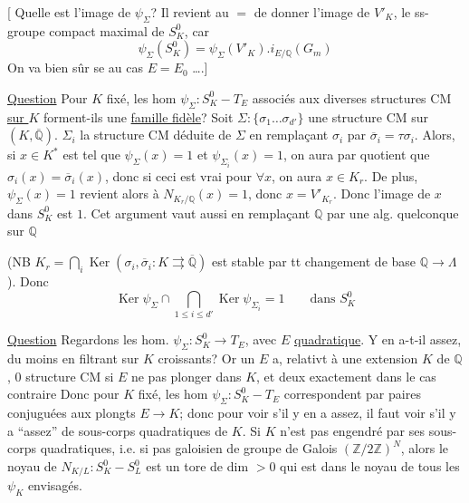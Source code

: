 [ Quelle est l'image de $\psi_\Sigma$? Il revient au $=$ de
donner l'image de $V'_K$, le ss-groupe compact maximal de $S_K^0$, car
\[
\psi_\Sigma(S_K^0)=\psi_\Sigma(V'_K).i_{E/\mathbb Q}(G_m)
\]
On va bien sûr se   au cas
$E=E_0$ \ldots.]

\uline{Question} Pour $K$ fixé,  les hom $\psi_\Sigma:S_K^0-T_E$ associés aux diverses
structures CM \uline{sur $K$}  forment-ils une \uline{famille fidèle}?
Soit $\Sigma:\{\sigma_1\ldots\sigma_{d'}\}$ une structure CM sur $(K,\overline{\mathbb Q})$.
 
$\Sigma_i$  la structure CM déduite de $\Sigma$ en remplaçant
$\sigma_i$ par $\overline\sigma_i=\tau\sigma_i$. Alors, si $x\in K^*$ est tel que
$\psi_\Sigma(x)=1$ et $\psi_{\Sigma_i}(x)=1$, on aura par quotient que
$\sigma_i(x)=\overline\sigma_i(x)$, donc si ceci est vrai pour $\forall x$,
on aura $x\in K_r$. De plus,  $\psi_\Sigma(x)=1$ revient alors à
$N_{K_r/\mathbb Q}(x)=1$, donc $x=V'_{K_r}$.
Donc l'image de $x$ dans $S_K^0$ est $1$.
Cet argument vaut aussi en remplaçant $\mathbb Q$ par une alg. quelconque sur $\mathbb Q$
\deleted{[car $\bigcap\operatorname{Ker}(\sigma_i,\overline\sigma_i)=K_r$ est
stable par}

(NB $K_r=\bigcap_i\operatorname{Ker}(\sigma_i,\overline\sigma_i:
K\rightrightarrows\overline{\mathbb Q})$ est stable par tt changement de base
$\mathbb Q\longrightarrow\Lambda$). Donc
\[
\operatorname{Ker}\psi_\Sigma\cap\bigcap_{1\leq i\leq d'}\operatorname{Ker}\psi_{\Sigma_i}
=1\qquad\text{dans }S_K^0
\]

\uline{Question} Regardons les hom. $\psi_\Sigma:S_K^0\longrightarrow T_E$, avec $E$
\uline{quadratique}. Y en a-t-il assez, du moins en filtrant sur $K$ croissants?
Or un $E$ a, relativt à une  extension $K$ de $\mathbb Q$,
 $0$ structure CM si $E$ ne pas plonger dans $K$, et deux exactement
dans le cas contraire 
\inserted{[L'hom $\psi_K$ correspondant est \deleted{\operatorname{Tr}_{K/E}} $N_{K/E}$.}
Donc pour $K$ fixé, les hom $\psi_\Sigma:S_K^0-T_E$ correspondent par paires conjuguées
aux plongts $E\longrightarrow K$; donc pour voir s'il y en a assez, il faut voir s'il y a
``assez'' de sous-corps quadratiques de $K$.
Si $K$  n'est pas 
engendré par ses sous-corps quadratiques, i.e. si  
pas galoisien de groupe de Galois $(\mathbb Z/2\mathbb Z)^N$, alors le noyau de
$N_{K/L}:S_K^0-S_L^0$ est un tore de dim $>0$ qui est dans le noyau de tous les
$\psi_K$ envisagés.

